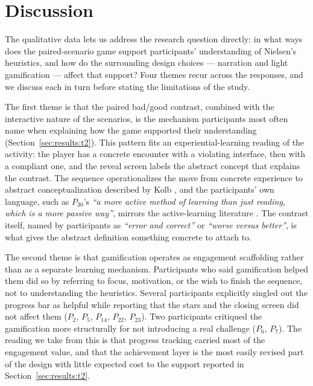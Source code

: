 \section{Discussion}
\label{sec:discussion}

The qualitative data lets us address the research question directly: in what ways does the paired-scenario game support participants' understanding of Nielsen's heuristics, and how do the surrounding design choices --- narration and light gamification --- affect that support? Four themes recur across the responses, and we discuss each in turn before stating the limitations of the study.

The first theme is that the paired bad/good contrast, combined with the interactive nature of the scenarios, is the mechanism participants most often name when explaining how the game supported their understanding (Section~\ref{sec:results:t2}). This pattern fits an experiential-learning reading of the activity: the player has a concrete encounter with a violating interface, then with a compliant one, and the reveal screen labels the abstract concept that explains the contrast. The sequence operationalizes the move from concrete experience to abstract conceptualization described by Kolb \cite{kolb1984experiential}, and the participants' own language, such as $P_{30}$'s \textit{``a more active method of learning than just reading, which is a more passive way''}, mirrors the active-learning literature \cite{bonwell1991active,freeman2014active}. The contrast itself, named by participants as \textit{``error and correct''} or \textit{``worse versus better''}, is what gives the abstract definition something concrete to attach to.

The second theme is that gamification operates as engagement scaffolding rather than as a separate learning mechanism. Participants who said gamification helped them did so by referring to focus, motivation, or the wish to finish the sequence, not to understanding the heuristics. Several participants explicitly singled out the progress bar as helpful while reporting that the stars and the closing screen did not affect them ($P_2$, $P_5$, $P_{14}$, $P_{22}$, $P_{23}$). Two participants critiqued the gamification more structurally for not introducing a real challenge ($P_6$, $P_7$). The reading we take from this is that progress tracking carried most of the engagement value, and that the achievement layer is the most easily revised part of the design with little expected cost to the support reported in Section~\ref{sec:results:t2}.

